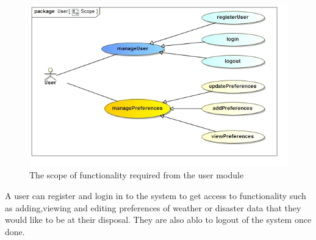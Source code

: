 
\begin{figure}[H]
	\centering
	\includegraphics[width=1.0\textwidth]{../images/funcReq/UserScope.jpg}
	\caption{The scope of functionality required from the user module \label{overflow}}
\end{figure}

A user can register and login in to the system to get access to functionality such as adding,viewing and editing preferences of weather or disaster data that they would like to be at their disposal. They are also ablo to logout of the system once done.